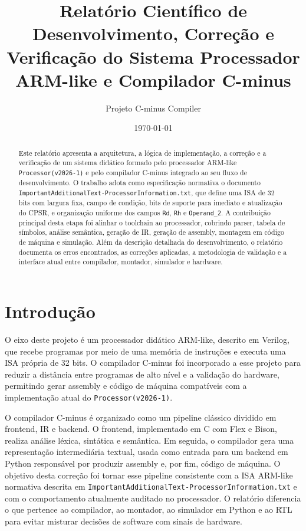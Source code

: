 \documentclass[12pt,a4paper]{article}
\title{Relatório Científico de Desenvolvimento, Correção e Verificação do Sistema Processador ARM-like e Compilador C-minus}
\author{Projeto C-minus Compiler}
\date{\today}
\begin{document}
\maketitle

\begin{abstract}
Este relatório apresenta a arquitetura, a lógica de implementação, a correção e a verificação de um sistema didático formado pelo processador ARM-like \texttt{Processor(v2026-1)} e pelo compilador C-minus integrado ao seu fluxo de desenvolvimento. O trabalho adota como especificação normativa o documento \texttt{ImportantAdditionalText-ProcessorInformation.txt}, que define uma ISA de 32 bits com largura fixa, campo de condição, bits de suporte para imediato e atualização do CPSR, e organização uniforme dos campos \texttt{Rd}, \texttt{Rh} e \texttt{Operand\_2}. A contribuição principal desta etapa foi alinhar o toolchain ao processador, cobrindo parser, tabela de símbolos, análise semântica, geração de IR, geração de assembly, montagem em código de máquina e simulação. Além da descrição detalhada do desenvolvimento, o relatório documenta os erros encontrados, as correções aplicadas, a metodologia de validação e a interface atual entre compilador, montador, simulador e hardware.
\end{abstract}

\section{Introdução}
O eixo deste projeto é um processador didático ARM-like, descrito em Verilog, que recebe programas por meio de uma memória de instruções e executa uma ISA própria de 32 bits. O compilador C-minus foi incorporado a esse projeto para reduzir a distância entre programas de alto nível e a validação do hardware, permitindo gerar assembly e código de máquina compatíveis com a implementação atual do \texttt{Processor(v2026-1)}.

O compilador C-minus é organizado como um pipeline clássico dividido em frontend, IR e backend. O frontend, implementado em C com Flex e Bison, realiza análise léxica, sintática e semântica. Em seguida, o compilador gera uma representação intermediária textual, usada como entrada para um backend em Python responsável por produzir assembly e, por fim, código de máquina. O objetivo desta correção foi tornar esse pipeline consistente com a ISA ARM-like normativa descrita em \texttt{ImportantAdditionalText-ProcessorInformation.txt} e com o comportamento atualmente auditado no processador. O relatório diferencia o que pertence ao compilador, ao montador, ao simulador em Python e ao RTL para evitar misturar decisões de software com sinais de hardware.
\end{document}

